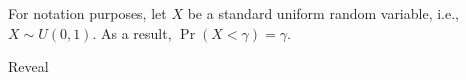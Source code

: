 \documentclass[12pt]{article}
\begin{document}
For notation purposes, let \(X\) be a standard uniform random variable, i.e., \(X \sim U(0, 1)\).
As a result, \(\Pr(X < \gamma ) = \gamma \).

\begin{algorithm}[H]
    \SetAlgoLined{}
    \DontPrintSemicolon{}
    \caption{Reveal}
\end{algorithm}
\end{document}

